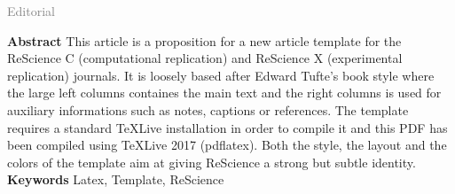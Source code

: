\documentclass[a4paper,10pt]{article}
\makeatletter
\def\maketitle{{%
  \renewenvironment{tabular}[2][]
    {\begin{flushleft}}
    {\end{flushleft}}
  \AB@maketitle}}
\makeatother
\begin{document}
\vspace{.5em}
{\sf \large \textcolor{gray}{Editorial}}

{\let\newpage\relax\maketitle}
\maketitle

{\sf \bfseries Abstract} This article is a proposition for a new
article template for the ReScience C (computational replication) and ReScience
X (experimental replication) journals. It is loosely based after Edward Tufte's
book style where the large left columns containes the main text and the right
columns is used for auxiliary informations such as notes, captions or
references. The template requires a standard TeXLive installation in order to
compile it and this PDF has been compiled using TeXLive 2017 (pdflatex). Both
the style, the layout and the colors of the template aim at giving ReScience a
strong but subtle identity.\\

{\sf \bfseries Keywords} Latex, Template, ReScience\\

\renewcommand{\baselinestretch}{0.5}\normalsize
\tableofcontents
\renewcommand{\baselinestretch}{1.0}\normalsize


\vfill
\end{document}

